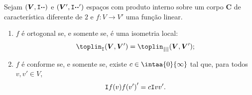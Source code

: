 \begin{prop}
Sejam $(\bm V,\mathtt I{\bm{\cdot}}{\bm{\cdot}})$ e $(\bm V',\mathtt I{\bm{\cdot}}{\bm{\cdot}}')$ espaços com produto interno sobre um corpo $\bm C$ de característica diferente de $2$ e $f\colon V \to V'$ uma função linear.
	\begin{enumerate}
	\item $f$ é ortogonal se, e somente se, é uma isometria local:
		\begin{equation*}
		\toplin_{\inte{}{}}(\bm V,\bm V') = \toplin_{\nor{}}(\bm V,\bm V');
		\end{equation*}
	\item $f$ é conforme se, e somente se, existe $c \in \intaa{0}{\infty}$ tal que, para todos $v,v' \in V$,
		\begin{equation*}
		\mathtt I{f(v)}{f(v')}' = c\mathtt I{v}{v'}.
		\end{equation*}
	\end{enumerate}
\end{prop}
